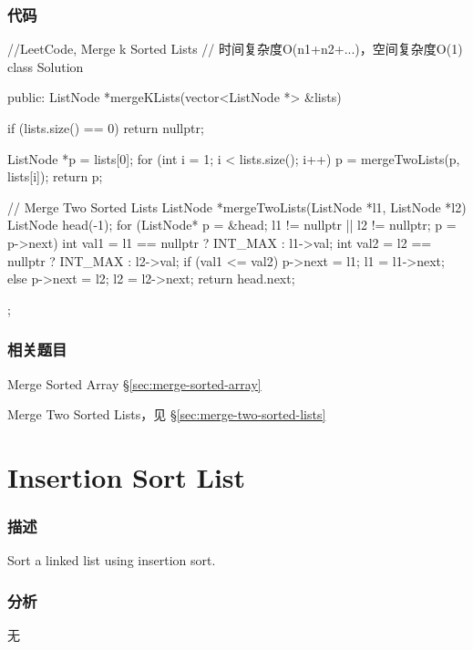 \subsubsection{代码}
\begin{Code}
	//LeetCode, Merge k Sorted Lists
	// 时间复杂度O(n1+n2+...)，空间复杂度O(1)
	class Solution {
		public:
		ListNode *mergeKLists(vector<ListNode *> &lists) {
			if (lists.size() == 0) return nullptr;
			
			ListNode *p = lists[0];
			for (int i = 1; i < lists.size(); i++) {
				p = mergeTwoLists(p, lists[i]);
			}
			return p;
		}
		
		// Merge Two Sorted Lists
		ListNode *mergeTwoLists(ListNode *l1, ListNode *l2) {
			ListNode head(-1);
			for (ListNode* p = &head; l1 != nullptr || l2 != nullptr; p = p->next) {
				int val1 = l1 == nullptr ? INT_MAX : l1->val;
				int val2 = l2 == nullptr ? INT_MAX : l2->val;
				if (val1 <= val2) {
					p->next = l1;
					l1 = l1->next;
				} else {
				p->next = l2;
				l2 = l2->next;
			}
		}
		return head.next;
	}
};
\end{Code}


\subsubsection{相关题目}
\begindot
\item Merge Sorted Array \S \ref{sec:merge-sorted-array}
\item Merge Two Sorted Lists，见 \S \ref{sec:merge-two-sorted-lists}
\myenddot


\section{Insertion Sort List} %
\label{sec:Insertion-Sort-List}


\subsubsection{描述}
Sort a linked list using insertion sort.


\subsubsection{分析}
无


